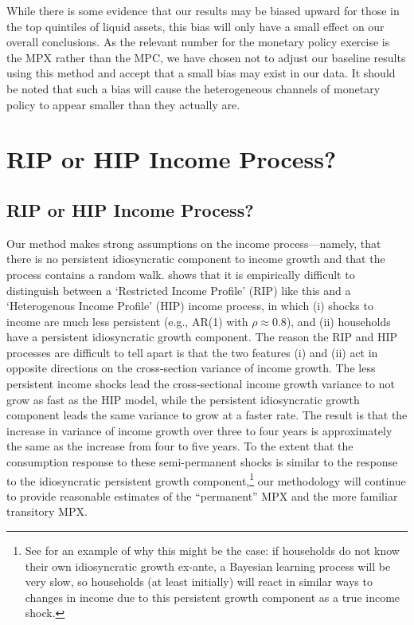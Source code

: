 \documentclass[titlepage]{\econtex}\newcommand{\texname}{ConsumptionHeterogeneity}
\begin{document}
	While there is some evidence that our results may be biased upward for those in the top quintiles of liquid assets, this bias will only have a small effect on our overall conclusions. As the relevant number for the monetary policy exercise is the MPX rather than the MPC, we have chosen not to adjust our baseline results using this method and accept that a small bias may exist in our data. It should be noted that such a bias will cause the heterogeneous channels of monetary policy to appear smaller than they actually are.
	
	
	\section{RIP or HIP Income Process?} \label{rip_hip_appendix}
	\setcounter{figure}{0}   
	\setcounter{table}{0} 
	\subsection{RIP or HIP Income Process?} \label{rip_hip}
	Our method makes strong assumptions on the income process---namely, that there is no persistent idiosyncratic component to income growth and that the process contains a random walk. \cite{guvenen_empirical_2009} shows that it is empirically difficult to distinguish between a `Restricted Income Profile' (RIP) like this and a `Heterogenous Income Profile' (HIP) income process, in which (i) shocks to income are much less persistent (e.g., AR(1) with $\rho\approx 0.8$), and (ii) households have a persistent idiosyncratic growth component. The reason the RIP and HIP processes are difficult to tell apart is that the two features (i) and (ii) act in opposite directions on the cross-section variance of income growth. The less persistent income shocks lead the cross-sectional income growth variance to not grow as fast as the HIP model, while the persistent idiosyncratic growth component leads the same variance to grow at a faster rate. The result is that the increase in variance of income growth over three to four years is approximately the same as the increase from four to five years. To the extent that the consumption response to these semi-permanent shocks is similar to the response to the idiosyncratic persistent growth component,\footnote{See \cite{guvenen_learning_2007} for an example of why this might be the case: if households do not know their own idiosyncratic growth ex-ante, a Bayesian learning process will be very slow, so households (at least initially) will react in similar ways to changes in income due to this persistent growth component as a true income shock.} our methodology will continue to provide reasonable estimates of the ``permanent'' MPX and the more familiar transitory MPX. 
	
\end{document}
